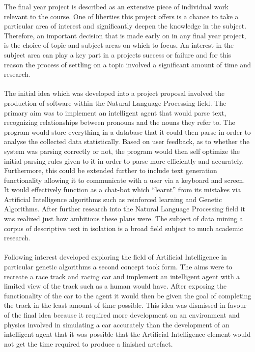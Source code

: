\documentclass[main.tex]{subfiles}
\begin{document}

The final year project is described as an extensive piece of individual work relevant to the course. One of liberties this project offers is a chance to take a particular area of interest and significantly deepen the knowledge in the subject. Therefore, an important decision that is made early on in any final year project, is the choice of topic and subject areas on which to focus. An interest in the subject area can play a key part in a projects success or failure and for this reason the process of settling on a topic involved a significant amount of time and research.

\paragraph{} The initial idea which was developed into a project proposal involved the production of software within the Natural Language Processing field. The primary aim was to implement an intelligent agent that would parse text, recognizing relationships between pronouns and the nouns they refer to. The program would store everything in a database that it could then parse in order to analyse the collected data statistically. Based on user feedback, as to whether the system was parsing correctly or not, the program would then self optimize the initial parsing rules given to it in order to parse more efficiently and accurately. Furthermore, this could be extended further to include text generation functionality allowing it to communicate with a user via a keyboard and screen. It would effectively function as a chat-bot which ``learnt'' from its mistakes via Artificial Intelligence algorithms such as reinforced learning and Genetic Algorithms. After further research into the Natural Language Processing field it was realized just how ambitious these plans were. The subject of data mining a corpus of descriptive text in isolation is a broad field subject to much academic research.

\paragraph{}Following interest developed exploring the field of Artificial Intelligence in particular genetic algorithms a second concept took form. The aims were to recreate a race track and racing car and implement an intelligent agent with a limited view of the track such as a human would have. After exposing the functionality of the car to the agent it would then be given the goal of completing the track in the least amount of time possible. This idea was dismissed in favour of the final idea because it required more development on an environment and physics involved in simulating a car accurately than the development of an intelligent agent that it was possible that the Artificial Intelligence element would not get the time required to produce a finished artefact.
\end{document}
